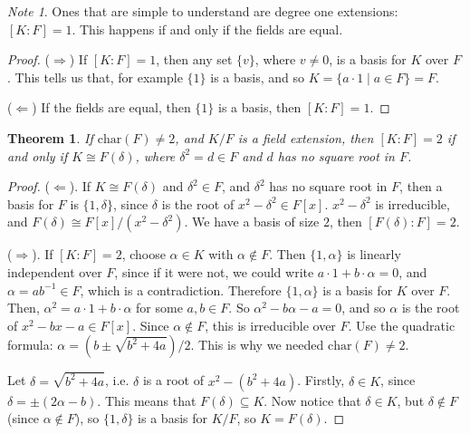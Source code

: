 \documentclass[12pt]{article}
\def\char{\text{char}}
\newtheorem{theorem}{Theorem}
\theoremstyle{remark}
\theoremstyle{remark}
\theoremstyle{remark}
\theoremstyle{remark}
\theoremstyle{remark}
\newtheorem*{note}{Note}
\begin{document}
\begin{note}
  Ones that are simple to understand are degree one extensions: $[K : F] = 1$.
  This happens if and only if the fields are equal.
\end{note}

\begin{proof}
  ($\Rightarrow$) If $[K : F] = 1$, then any set $\{v\}$, where $v \ne 0$, is
  a basis for $K$ over $F$. This tells us that, for example $\{1\}$ is a basis,
  and so $K = \{ a \cdot 1 \mid a \in F \} = F$.

  ($\Leftarrow$) If the fields are equal, then $\{1\}$ is a basis, then $[K : F]
  = 1$.
\end{proof}

\begin{theorem}
  If $\char(F) \ne 2$, and $K / F$ is a field extension, then $[K : F] = 2$ if
  and only if $K \cong F(\delta)$, where $\delta^2 = d \in F$ and $d$ has no
  square root in $F$.
\end{theorem}

\begin{proof}
  ($\Leftarrow$). If $K \cong F(\delta)$ and $\delta^2 \in F$, and $\delta^2$
  has no square root in $F$, then a basis for $F$ is $\{1, \delta\}$, since
  $\delta$ is the root of $x^2 - \delta^2 \in F[x]$. $x^2 - \delta^2$ is
  irreducible, and $F(\delta) \cong F[x] / (x^2 - \delta^2)$. We have a basis of
  size $2$, then $[F(\delta) : F] = 2$.

  ($\Rightarrow$). If $[K : F] = 2$, choose $\alpha \in K$ with $\alpha \not\in
  F$. Then $\{1, \alpha\}$ is linearly independent over $F$, since if it were
  not, we could write $a \cdot 1 + b \cdot \alpha = 0$, and $\alpha = ab^{-1}
  \in F$, which is a contradiction. Therefore $\{1, \alpha\}$ is a basis for $K$
  over $F$. Then, $\alpha^2 = a \cdot 1 + b \cdot \alpha$ for some $a, b \in F$.
  So $\alpha^2 - b \alpha - a = 0$, and so $\alpha$ is the root of $x^2 - bx - a
  \in F[x]$. Since $\alpha \not\in F$, this is irreducible over $F$. Use the
  quadratic formula: $\alpha = (b \pm \sqrt{b^2 + 4a}) / 2$. This is why we
  needed $\char(F) \ne 2$.

  Let $\delta = \sqrt{b^2 + 4a}$, i.e. $\delta$ is a root of $x^2 - (b^2 + 4a)$.
  Firstly, $\delta \in K$, since $\delta = \pm (2\alpha - b)$. This means that
  $F(\delta) \subseteq K$. Now notice that $\delta \in K$, but $\delta \not\in
  F$ (since $\alpha \not\in F$), so $\{1, \delta \}$ is a basis for $K / F$, so
  $K = F(\delta)$.
\end{proof}
\end{document}

